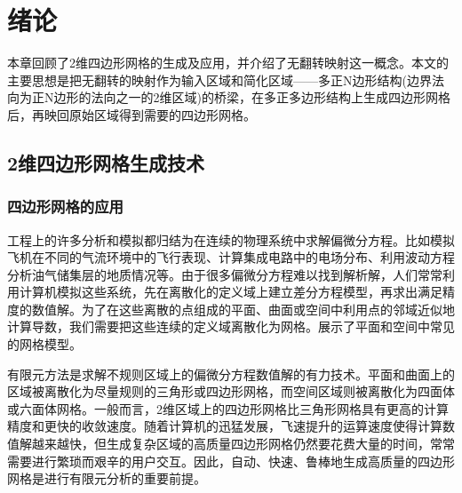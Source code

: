 \chapter{绪论}\label{intro}
本章回顾了2维四边形网格的生成及应用，并介绍了无翻转映射这一概念。本文的主要思想是把无翻转的映射作为输入区域和简化区域——多正N边形结构(边界法向为正N边形的法向之一的2维区域)的桥梁，在多正多边形结构上生成四边形网格后，再映回原始区域得到需要的四边形网格。
\section{2维四边形网格生成技术}\label{quad-teche}
\subsection{四边形网格的应用}\label{application}
工程上的许多分析和模拟都归结为在连续的物理系统中求解偏微分方程。比如模拟飞机在不同的气流环境中的飞行表现、计算集成电路中的电场分布、利用波动方程分析油气储集层的地质情况等。由于很多偏微分方程难以找到解析解，人们常常利用计算机模拟这些系统，先在离散化的定义域上建立差分方程模型，再求出满足精度的数值解。为了在这些离散的点组成的平面、曲面或空间中利用点的邻域近似地计算导数，我们需要把这些连续的定义域离散化为网格。展示了平面和空间中常见的网格模型。

有限元方法是求解不规则区域上的偏微分方程数值解的有力技术。平面和曲面上的区域被离散化为尽量规则的三角形或四边形网格，而空间区域则被离散化为四面体或六面体网格。一般而言，2维区域上的四边形网格比三角形网格具有更高的计算精度和更快的收敛速度。随着计算机的迅猛发展，飞速提升的运算速度使得计算数值解越来越快，但生成复杂区域的高质量四边形网格仍然要花费大量的时间，常常需要进行繁琐而艰辛的用户交互。因此，自动、快速、鲁棒地生成高质量的四边形网格是进行有限元分析的重要前提。

